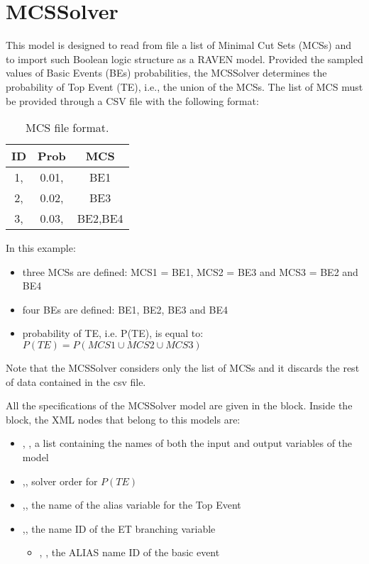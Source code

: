 \section{MCSSolver}
\label{sec:MCSSolver}

This model is designed to read from file a list of Minimal Cut Sets (MCSs) and to import such Boolean logic structure as a RAVEN model.
Provided the sampled values of Basic Events (BEs) probabilities, the MCSSolver determines the probability of Top Event (TE), i.e., the union of the MCSs.
The list of MCS must be provided through a CSV file with the following format:

\begin{table}
  \begin{center}
    \caption{MCS file format.}
    \label{tab:table1}
    \begin{tabular}{c|c|c} 
      \textbf{ID} & \textbf{Prob} & \textbf{MCS}\\
      \hline
      1, & 0.01, & BE1\\
      2, & 0.02, & BE3\\
      3, & 0.03, & BE2,BE4\\
    \end{tabular}
  \end{center}
\end{table}

In this example:
\begin{itemize}
  \item three MCSs are defined: MCS1 = BE1, MCS2 = BE3 and MCS3 = BE2 and BE4 
  \item four BEs are defined: BE1, BE2, BE3 and BE4
  \item probability of TE, i.e. P(TE), is equal to: $P(TE) = P(MCS1 \cup MCS2 \cup MCS3)$
\end{itemize}

Note that the MCSSolver considers only the list of MCSs and it discards the rest of data contained in the csv file.

All the specifications of the MCSSolver model are given in the  block. 
Inside the  block, the XML nodes that belong to this models are:
\begin{itemize}
  \item  {}, , a list containing the names of both the input and output variables of the model
  \item  {},, solver order for $P(TE)$ 
  \item  {},, the name of the alias variable for the Top Event
  \item  {},, the name ID of the ET branching variable
	  \begin{itemize}
	    \item {}, , the ALIAS name ID of the basic event
	  \end{itemize}
\end{itemize}

